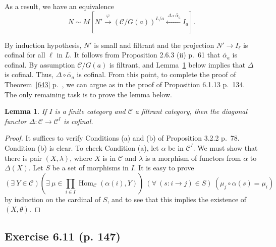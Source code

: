 \documentclass[12pt]{article}%
\newtheorem{lem}[thm]{Lemma}
\theoremstyle{remark}
\theoremstyle{definition}
\newcommand{\C}{\mathcal C}
\DeclareMathOperator{\Hom}{Hom}%
\begin{document}
As a result, we have an equivalence 
$$ 
N\sim M\left[N'\xrightarrow{\varphi}(\C/G(a))^{L/a}\xleftarrow{\ \Delta\circ\widetilde{\alpha_a}}I_a\right]. 
$$

By induction hypothesis, $N'$ is small and filtrant and the projection $N'\to I_\ell$ is cofinal for all $\ell$ in $L$. It follows from Proposition 2.6.3 (ii) p.~61 that $\widetilde{\alpha_a}$ is cofinal. By assumption $\C/G(a)$ is filtrant, and Lemma~\ref{delta} below implies that $\Delta$ is cofinal. Thus, $\Delta\circ\widetilde{\alpha_a}$ is cofinal. From this point, to complete the proof of Theorem~\ref{643} p.~\pageref{643}, we can argue as in the proof of Proposition 6.1.13 p.~134. The only remaining task is to prove the lemma below.

\begin{lem}\label{delta}
If $I$ is a finite category and $\C$ a filtrant category, then the diagonal functor $\Delta:\C\to\C^I$ is cofinal.
\end{lem}
%
\begin{proof}
It suffices to verify Conditions (a) and (b) of Proposition 3.2.2 p.~78. Condition (b) is clear. To check Condition (a), let $\alpha$ be in $\C^I$. We must show that there is pair $(X,\lambda)$, where $X$ is in $\C$ and $\lambda$ is a morphism of functors from $\alpha$ to $\Delta(X)$. Let $S$ be a set of morphisms in $I$. It is easy to prove 
$$
(\exists\ Y\in\C)\left(\exists\ \mu\in\prod_{i\in I}\Hom_\C(\alpha(i),Y)\right)\ (\forall\ (s:i\to j)\in S)\ (\mu_{j}\circ\alpha(s)=\mu_i) 
$$ 
by induction on the cardinal of $S$, and to see that this implies the existence of $(X,\theta)$.
\end{proof}


\subsection{Exercise 6.11 (p. 147)} 
\end{document}
